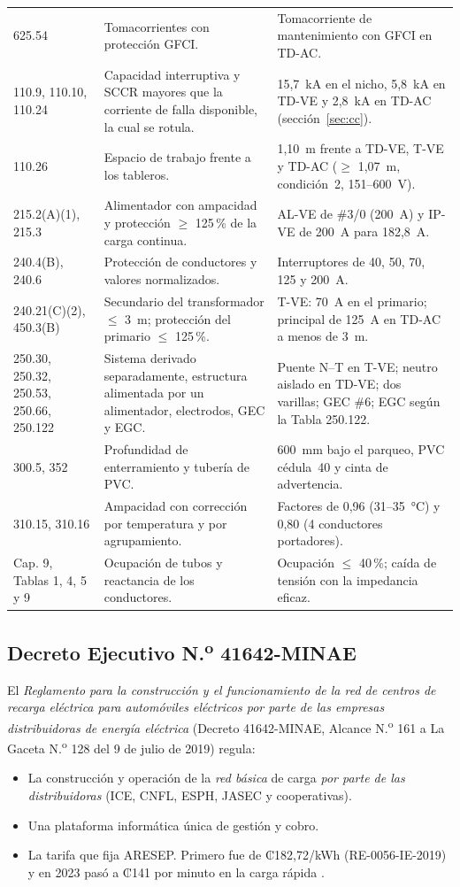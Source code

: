 {\begin{longtable}{L{2.3cm}L{5.6cm}L{7.1cm}}
625.54 & Tomacorrientes con protección GFCI. & Tomacorriente de mantenimiento con GFCI en TD-AC.\\
110.9, 110.10, 110.24 & Capacidad interruptiva y SCCR mayores que la corriente de falla disponible, la cual se rotula. & 15,7~kA en el nicho, 5,8~kA en TD-VE y 2,8~kA en TD-AC (sección~\ref{sec:cc}).\\
110.26 & Espacio de trabajo frente a los tableros. & 1,10~m frente a TD-VE, T-VE y TD-AC ($\ge$ 1,07~m, condición~2, 151--600~V).\\
215.2(A)(1), 215.3 & Alimentador con ampacidad y protección $\ge$ 125\,\% de la carga continua. & AL-VE de \#3/0 (200~A) y IP-VE de 200~A para 182,8~A.\\
240.4(B), 240.6 & Protección de conductores y valores normalizados. & Interruptores de 40, 50, 70, 125 y 200~A.\\
240.21(C)(2), 450.3(B) & Secundario del transformador $\le$ 3~m; protección del primario $\le$ 125\,\%. & T-VE: 70~A en el primario; principal de 125~A en TD-AC a menos de 3~m.\\
250.30, 250.32, 250.53, 250.66, 250.122 & Sistema derivado separadamente, estructura alimentada por un alimentador, electrodos, GEC y EGC. & Puente N--T en T-VE; neutro aislado en TD-VE; dos varillas; GEC \#6; EGC según la Tabla 250.122.\\
300.5, 352 & Profundidad de enterramiento y tubería de PVC. & 600~mm bajo el parqueo, PVC cédula~40 y cinta de advertencia.\\
310.15, 310.16 & Ampacidad con corrección por temperatura y por agrupamiento. & Factores de 0,96 (31--35~°C) y 0,80 (4 conductores portadores).\\
Cap. 9, Tablas 1, 4, 5 y 9 & Ocupación de tubos y reactancia de los conductores. & Ocupación $\le$ 40\,\%; caída de tensión con la impedancia eficaz.\\
\bottomrule
\end{longtable}}

\subsection{Decreto Ejecutivo N.\textsuperscript{o} 41642-MINAE}
El \emph{Reglamento para la construcción y el funcionamiento de la red de centros de recarga eléctrica para automóviles eléctricos por parte de las empresas distribuidoras de energía eléctrica} (Decreto 41642-MINAE, Alcance N.\textsuperscript{o} 161 a La Gaceta N.\textsuperscript{o} 128 del 9 de julio de 2019) \cite{aresep2019} regula:
\begin{itemize}
\item La construcción y operación de la \emph{red básica} de carga \emph{por parte de las distribuidoras} (ICE, CNFL, ESPH, JASEC y cooperativas).
\item Una plataforma informática única de gestión y cobro.
\item La tarifa que fija ARESEP. Primero fue de ₡182,72/kWh (RE-0056-IE-2019) y en 2023 pasó a ₡141 por minuto en la carga rápida \cite{aresep2019,aresep2023}.
\end{itemize}

